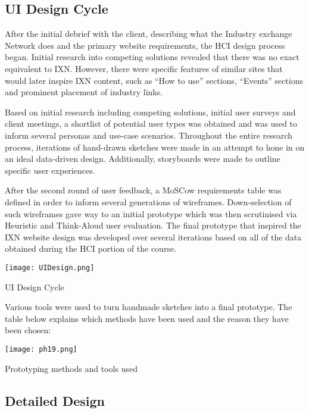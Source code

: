 \documentclass[fontsize=11pt]{extarticle}
\numberwithin{figure}{section} %
\begin{document}
\hypertarget{ui-design-cycle}{%
\subsection{UI Design Cycle}\label{ui-design-cycle}}

After the initial debrief with the client, describing what the Industry
exchange Network does and the primary website requirements, the HCI
design process began. Initial research into competing solutions revealed
that there was no exact equivalent to IXN. However, there were specific
features of similar sites that would later inspire IXN content, such as
``How to use'' sections, ``Events'' sections and prominent placement of
industry links.

Based on initial research including competing solutions, initial user
surveys and client meetings, a shortlist of potential user types was
obtained and was used to inform several personas and use-case scenarios.
Throughout the entire research process, iterations of hand-drawn
sketches were made in an attempt to hone in on an ideal data-driven
design. Additionally, storyboards were made to outline specific user
experiences.

After the second round of user feedback, a MoSCow requirements table was
defined in order to inform several generations of wireframes.
Down-selection of such wireframes gave way to an initial prototype which
was then scrutinised via Heuristic and Think-Aloud user evaluation. The
final prototype that inspired the IXN website design was developed over
several iterations based on all of the data obtained during the HCI
portion of the course.

\begin{table}[H]
\centering
\texttt{[image: UIDesign.png]}
\caption{UI Design Cycle}
\label{UIDesign}
\end{table}

Various tools were used to turn handmade sketches into a final
prototype. The table below explains which methods have been used and the
reason they have been chosen:

\begin{table}[H]
      \centering
      \texttt{[image: ph19.png]}
      \caption{Prototyping methods and tools used}
 \end{table}

\hypertarget{detailed-design}{%
\subsection{Detailed Design}\label{detailed-design}}
\end{document}
